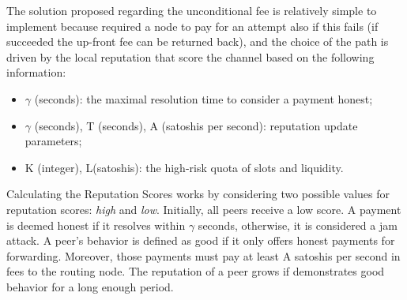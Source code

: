 The solution proposed regarding the unconditional fee is relatively simple to implement 
because required a node to pay for an attempt also if this fails (if succeeded the up-front fee can 
be returned back), and the choice of the path is driven by the local reputation that 
score the channel based on the following information:

\begin{itemize}
    \item  $\gamma$ (seconds): the maximal resolution time to consider a payment honest;
    \item  $\gamma$  (seconds), T (seconds), A (satoshis per second): reputation update 
    parameters;
    \item  K (integer), L(satoshis): the high-risk quota of slots and liquidity.
\end{itemize}


Calculating the Reputation Scores works by considering two possible values
for reputation scores:  \emph{high}  and  \emph{low}. Initially, all peers 
receive a low score. A payment is deemed  honest  if it resolves within  
$\gamma$  seconds, otherwise, it is considered a jam attack. 
A peer’s behavior is defined as  good  if it only offers honest payments 
for forwarding. Moreover, those payments must pay at least A satoshis 
per second in fees to the routing node. The reputation of a peer grows if 
demonstrates good behavior for a long enough period.
